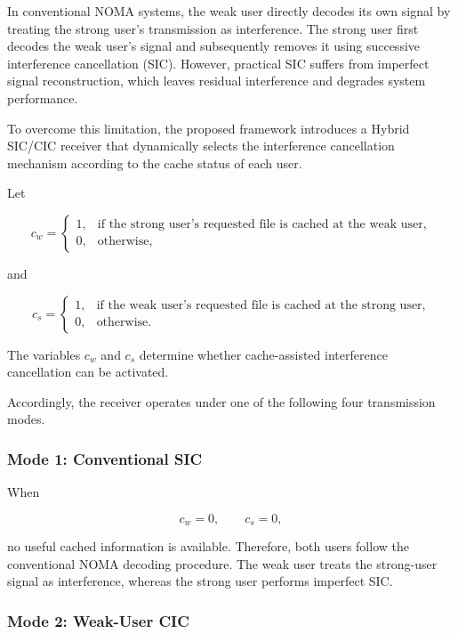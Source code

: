 \documentclass[conference]{IEEEtran}
\begin{document}
In conventional NOMA systems, the weak user directly decodes its own signal by treating the strong user's transmission as interference. The strong user first decodes the weak user's signal and subsequently removes it using successive interference cancellation (SIC). However, practical SIC suffers from imperfect signal reconstruction, which leaves residual interference and degrades system performance.

To overcome this limitation, the proposed framework introduces a Hybrid SIC/CIC receiver that dynamically selects the interference cancellation mechanism according to the cache status of each user.

Let

\begin{equation}
c_w=
\begin{cases}
1,&\text{if the strong user's requested file is cached at the weak user},\\
0,&\text{otherwise},
\end{cases}
\end{equation}

and

\begin{equation}
c_s=
\begin{cases}
1,&\text{if the weak user's requested file is cached at the strong user},\\
0,&\text{otherwise}.
\end{cases}
\end{equation}

The variables $c_w$ and $c_s$ determine whether cache-assisted interference cancellation can be activated.

Accordingly, the receiver operates under one of the following four transmission modes.

\subsubsection*{Mode 1: Conventional SIC}

When

\[
c_w=0,\qquad c_s=0,
\]

no useful cached information is available. Therefore, both users follow the conventional NOMA decoding procedure. The weak user treats the strong-user signal as interference, whereas the strong user performs imperfect SIC.

\subsubsection*{Mode 2: Weak-User CIC}
\end{document}
